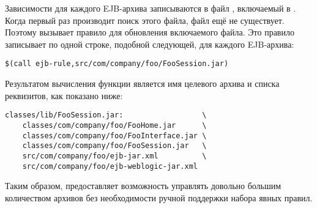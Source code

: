 Зависимости для каждого EJB\hyp{}архива записываются в файл
, включаемый в \Makefile{}. Когда \GNUmake{} первый
раз производит поиск этого файла, файл ещё не существует. Поэтому
\GNUmake{} вызывает правило для обновления включаемого файла. Это
правило записывает по одной строке, подобной следующей, для каждого
EJB\hyp{}архива:

{\footnotesize
\begin{verbatim}
$(call ejb-rule,src/com/company/foo/FooSession.jar)
\end{verbatim}
}

Результатом вычисления функции  является
имя целевого архива и списка реквизитов, как показано ниже:

{\footnotesize
\begin{verbatim}
classes/lib/FooSession.jar:                  \
    classes/com/company/foo/FooHome.jar      \
    classes/com/company/foo/FooInterface.jar \
    classes/com/company/foo/FooSession.jar   \
    src/com/company/foo/ejb-jar.xml          \
    src/com/company/foo/ejb-weblogic-jar.xml
\end{verbatim}
}

Таким образом, \GNUmake{} предоставляет возможность управлять довольно
большим количеством архивов без необходимости ручной поддержки набора
явных правил.
